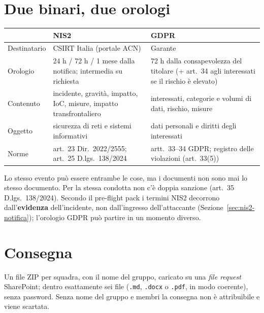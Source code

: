 \section{Due binari, due orologi}

\begin{center}
\small
\begin{tabularx}{\linewidth}{>{\raggedright\arraybackslash}p{2.3cm} X X}
\toprule
 & \textbf{NIS2} & \textbf{GDPR}\\
\midrule
Destinatario & CSIRT Italia (portale ACN) & Garante\\
Orologio & 24 h / 72 h / 1 mese dalla notifica; intermedia su richiesta & 72 h dalla consapevolezza
  del titolare (+ art.~34 agli interessati se il rischio è elevato)\\
Contenuto & incidente, gravità, impatto, IoC, misure, impatto transfrontaliero & interessati,
  categorie e volumi di dati, rischio, misure\\
Oggetto & sicurezza di reti e sistemi informativi & dati personali e diritti degli interessati\\
Norme & art.~23 Dir.~2022/2555; art.~25 D.lgs.~138/2024 & artt.~33--34 GDPR; registro delle
  violazioni (art.~33(5))\\
\bottomrule
\end{tabularx}
\end{center}
Lo stesso evento può essere entrambe le cose, ma i documenti non sono mai lo stesso documento. Per la
stessa condotta non c'è doppia sanzione (art.~35 D.lgs.~138/2024). Secondo il pre-flight pack i termini
NIS2 decorrono dall'\textbf{evidenza} dell'incidente, non dall'ingresso dell'attaccante
(Sezione~\ref{sec:nis2-notifica}); l'orologio GDPR può partire in un momento diverso.

\section{Consegna}

Un file ZIP per squadra, con il nome del gruppo, caricato su una \emph{file request} SharePoint; dentro
esattamente sei file (\texttt{.md}, \texttt{.docx} o \texttt{.pdf}, in modo coerente), senza password.
Senza nome del gruppo e membri la consegna non è attribuibile e viene scartata.

